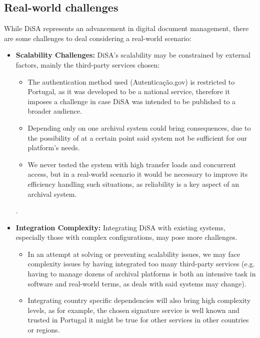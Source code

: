 \documentclass[a4paper,11pt]{article}
\begin{document}
        \subsection{Real-world challenges}
            \quad While DiSA represents an advancement in digital document management, there are some challenges to deal considering a real-world scenario:
            \begin{itemize}
                \item \textbf{Scalability Challenges:}
                DiSA's scalability may be constrained by external factors, mainly the third-party services chosen:
                \begin{itemize}
                    \item The authentication method used (Autenticação.gov) is restricted to Portugal, as it was developed to be a national service, therefore it imposes a challenge in case DiSA was intended to be published to a broader audience.

                    \item Depending only on one archival system could bring consequences, due to the possibility of at a certain point said system not be sufficient for our platform's needs.

                    \item We never tested the system with high transfer loads and concurrent access, but in a real-world scenario it would be necessary to improve its efficiency handling such situations, as reliability is a key aspect of an archival system.
                \end{itemize}.
                 
                \item \textbf{Integration Complexity:} Integrating DiSA with existing systems, especially those with complex configurations, may pose more challenges. 
                \begin{itemize}
                    \item In an attempt at solving or preventing scalability issues, we may face complexity issues by having integrated too many third-party services (e.g. having to manage dozens of archival platforms is both an intensive task in software and real-world terms, as deals with said systems may change).

                    \item Integrating country specific dependencies will also bring high complexity levels, as for example, the chosen signature service is well known and trusted in Portugal it might be true for other services in other countries or regions.


\end{itemize}
\end{itemize}
\end{document}
